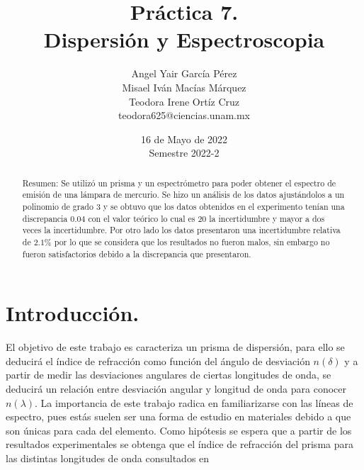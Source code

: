 \documentclass[DIV=calc, paper=a4, fontsize=11pt]{scrartcl}
\title{Práctica 7. \\ %
Dispersión y Espectroscopia} %
\author{Angel Yair García Pérez \\
Misael Iván Macías Márquez\\
Teodora Irene Ortíz Cruz\\
\small{teodora625@ciencias.unam.mx}\\}
\date{16 de Mayo de 2022\\Semestre 2022-2}
\begin{document}
\maketitle
{}
\begin{abstract}

  \textcolor{carmine}{Resumen:} Se utilizó un prisma y un espectrómetro para poder obtener el espectro de emisión de una lámpara de mercurio. Se hizo un análisis de los datos ajustándolos a un polinomio de grado 3 y se obtuvo que los datos obtenidos en el experimento tenían una discrepancia $0.04$ con el valor teórico lo cual es 20 la incertidumbre y mayor a dos veces la incertidumbre. Por otro lado los datos presentaron una incertidumbre relativa de $2.1\%$ por lo que se considera que los resultados no fueron malos, sin embargo no fueron satisfactorios debido a la discrepancia que presentaron.
\end{abstract}
\section*{\textcolor{carmine}{Introducción.}}
El objetivo de este trabajo es caracteriza un prisma de dispersión, para ello se deducirá el índice de refracción como función del ángulo de desviación $n(\delta)$ y a partir de medir las desviaciones angulares de ciertas longitudes de onda, se deducirá un relación entre desviación angular y longitud de onda para conocer $n(\lambda)$\cite{Manual}. La importancia de este trabajo radica en familiarizarse con las líneas de espectro, pues estás suelen ser una forma de estudio en materiales debido a que son únicas para cada del elemento. Como hipótesis se espera que a partir de los resultados experimentales se obtenga que el índice de refracción del prisma para las distintas longitudes de onda consultados en \cite{indices}
\end{document}

